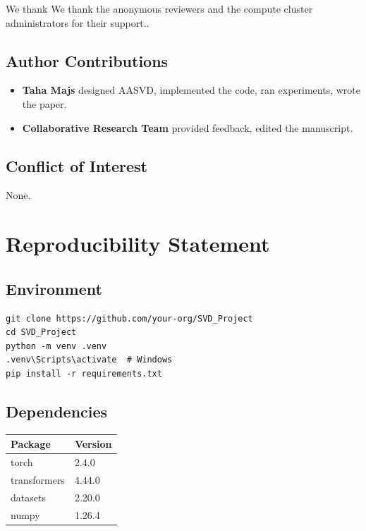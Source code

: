 We thank We thank the anonymous reviewers and the compute cluster administrators for their support..

\subsection{Author Contributions}

\begin{itemize}
\item \textbf{Taha Majs} designed AASVD, implemented the code, ran experiments,
  wrote the paper.
\item \textbf{Collaborative Research Team} provided feedback, edited the manuscript.

\end{itemize}
\subsection{Conflict of Interest}

None.


\section{Reproducibility Statement}

\subsection{Environment}

\begin{lstlisting}
git clone https://github.com/your-org/SVD_Project
cd SVD_Project
python -m venv .venv
.venv\Scripts\activate  # Windows
pip install -r requirements.txt
\end{lstlisting}

\subsection{Dependencies}

\begin{table}[H]
\centering
\small
\begin{tabular}{ll}
\toprule
\textbf{Package} & \textbf{Version} \\
\midrule
torch & 2.4.0 \\
transformers & 4.44.0 \\
datasets & 2.20.0 \\
numpy & 1.26.4 \\
\bottomrule
\end{tabular}
\end{table}

